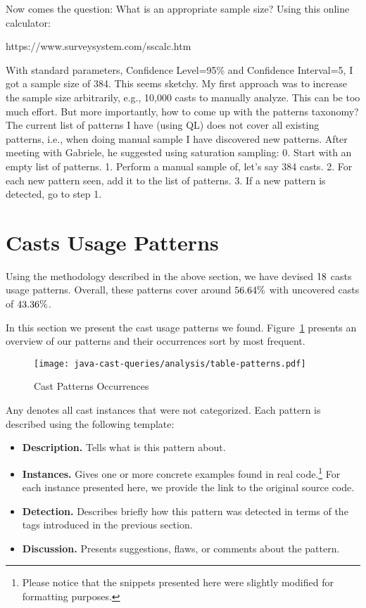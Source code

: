Now comes the question: What is an appropriate sample size?
Using this online calculator:

https://www.surveysystem.com/sscalc.htm

With standard parameters, Confidence Level=95\% and Confidence Interval=5,
I got a sample size of 384.
This seems sketchy.
My first approach was to increase the sample size arbitrarily,
e.g., 10,000 casts to manually analyze.
This can be too much effort.
But more importantly, how to come up with the patterns taxonomy?
The current list of patterns I have (using QL) does not cover all
existing patterns, i.e.,
when doing manual sample I have discovered new patterns.
After meeting with Gabriele, he suggested using saturation sampling:
0. Start with an empty list of patterns.
1. Perform a manual sample of, let’s say 384 casts.
2. For each new pattern seen, add it to the list of patterns.
3. If a new pattern is detected, go to step 1.


\section{Casts Usage Patterns}

\label{sec:patterns}

Using the methodology described in the above section,
we have devised $18{}$ casts usage patterns.
Overall, these patterns cover around 
$56.64\%$
with uncovered casts of
$43.36\%$.

In this section we present the cast usage patterns we found.
Figure~\ref{fig:patterns} presents an overview of our patterns and their occurrences sort by most frequent.

\begin{figure}[ht!]
\centering
\texttt{[image: java-cast-queries/analysis/table-patterns.pdf]}
\caption{Cast Patterns Occurrences} \label{fig:patterns}
\end{figure}

Any denotes all cast instances that were not categorized.
Each pattern is described using the following template:

\begin{itemize}
\item \textbf{Description.}
Tells what is this pattern about.
\item \textbf{Instances.}
Gives one or more concrete examples found in real
code.\footnote{Please notice that the snippets presented here were slightly modified for formatting purposes.}
For each instance presented here,
we provide the link to the original source code.
\item \textbf{Detection.}
Describes briefly how this pattern was detected in terms of the tags
introduced in the previous section.
\item \textbf{Discussion.}
Presents suggestions, flaws, or comments about the pattern.
\end{itemize}

